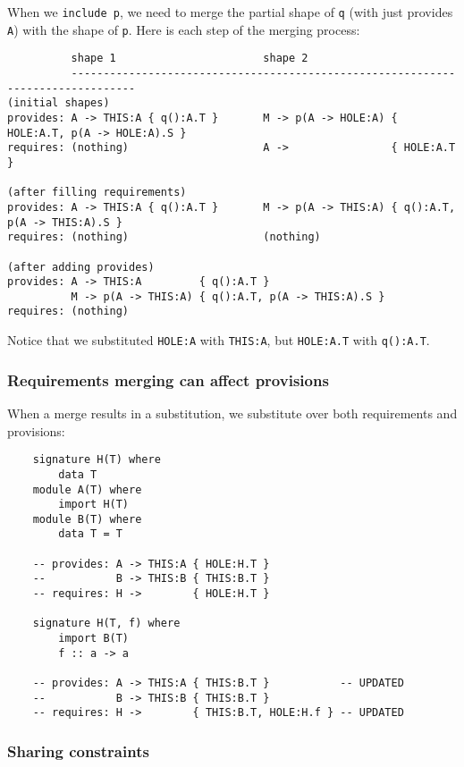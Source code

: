 \documentclass{article}
\begin{document}
When we \verb|include p|, we need to merge the partial shape
of \verb|q| (with just provides \verb|A|) with the shape
of \verb|p|.  Here is each step of the merging process:

\begin{verbatim}
          shape 1                       shape 2
          --------------------------------------------------------------------------------
(initial shapes)
provides: A -> THIS:A { q():A.T }       M -> p(A -> HOLE:A) { HOLE:A.T, p(A -> HOLE:A).S }
requires: (nothing)                     A ->                { HOLE:A.T }

(after filling requirements)
provides: A -> THIS:A { q():A.T }       M -> p(A -> THIS:A) { q():A.T, p(A -> THIS:A).S }
requires: (nothing)                     (nothing)

(after adding provides)
provides: A -> THIS:A         { q():A.T }
          M -> p(A -> THIS:A) { q():A.T, p(A -> THIS:A).S }
requires: (nothing)
\end{verbatim}

Notice that we substituted \verb|HOLE:A| with \verb|THIS:A|, but \verb|HOLE:A.T| with \verb|q():A.T|.

\subsubsection{Requirements merging can affect provisions}

When a merge results in a substitution, we substitute over both
requirements and provisions:

\begin{verbatim}
    signature H(T) where
        data T
    module A(T) where
        import H(T)
    module B(T) where
        data T = T

    -- provides: A -> THIS:A { HOLE:H.T }
    --           B -> THIS:B { THIS:B.T }
    -- requires: H ->        { HOLE:H.T }

    signature H(T, f) where
        import B(T)
        f :: a -> a

    -- provides: A -> THIS:A { THIS:B.T }           -- UPDATED
    --           B -> THIS:B { THIS:B.T }
    -- requires: H ->        { THIS:B.T, HOLE:H.f } -- UPDATED
\end{verbatim}

\subsubsection{Sharing constraints}
\end{document}

